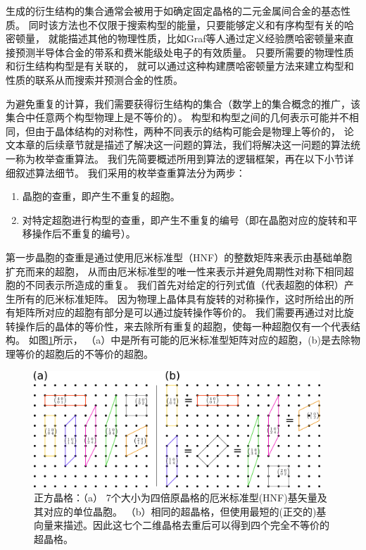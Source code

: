 生成的衍生结构的集合通常会被用于如确定固定晶格的二元金属间合金的基态性质。
同时该方法也不仅限于搜索构型的能量，只要能够定义和有序构型有关的哈密顿量，
就能描述其他的物理性质，比如Graf等人\cite{graf2005direct}通过定义经验赝哈密顿量来直接预测半导体合金的带系和费米能级处电子的有效质量。
只要所需要的物理性质和衍生结构构型是有关联的，
就可以通过这种构建赝哈密顿量方法来建立构型和性质的联系从而搜索并预测合金的性质。

为避免重复的计算，我们需要获得衍生结构的集合（数学上的集合概念的推广，该集合中任意两个构型物理上是不等价的）。
构型和构型之间的几何表示可能并不相同，但由于晶体结构的对称性，两种不同表示的结构可能会是物理上等价的，
论文本章的后续章节就是描述了解决这一问题的算法，我们将解决这一问题的算法统一称为枚举查重算法。
我们先简要概述所用到算法的逻辑框架，再在以下小节详细叙述算法细节。
我们采用的枚举查重算法分为两步：
\begin{enumerate}
  \item 晶胞的查重，即产生不重复的超胞。
  \item 对特定超胞进行构型的查重，即产生不重复的编号（即在晶胞对应的旋转和平移操作后不重复的编号）。
\end{enumerate}

第一步晶胞的查重是通过使用厄米标准型（HNF）的整数矩阵来表示由基础单胞扩充而来的超胞，
从而由厄米标准型的唯一性来表示并避免周期性对称下相同超胞的不同表示所造成的重复。
我们首先对给定的行列式值（代表超胞的体积）产生所有的厄米标准矩阵。
因为物理上晶体具有旋转的对称操作，这时所给出的所有矩阵所对应的超胞有部分是可以通过旋转操作等价的。
我们需要再通过对比旋转操作后的晶体的等价性，来去除所有重复的超胞，使每一种超胞仅有一个代表结构。
如图\ref{fig:ch4_2d_square_lattice}所示，
（a）中是所有可能的厄米标准型矩阵对应的超胞，(b)是去除物理等价的超胞后的不等价的超胞。

\begin{figure}
  \includegraphics[width=0.96\textwidth]{figs/ch4_2d_square_lattice.png}
  \centering
  \caption{正方晶格：（a） 7个大小为四倍原晶格的厄米标准型(HNF)基矢量及其对应的单位晶胞。
  （b）相同的超晶格，但使用最短的(正交的)基向量来描述。因此这七个二维晶格去重后可以得到四个完全不等价的超晶格。}
  \label{fig:ch4_2d_square_lattice}
\end{figure}

